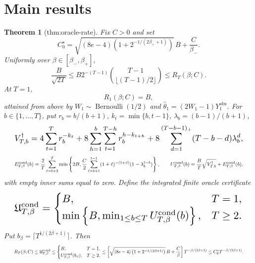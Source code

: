 \documentclass{article}
\newtheorem{theorem}{Theorem}
\begin{document}
\section{Main results}

\begin{theorem}[thm:oracle-rate]\label{thm:oracle-rate}
Fix \(C>0\) and set \[C_0^\star=\sqrt{(8e-4)\left(1+2^{-1/(2\beta_++1)}\right)}\,B+\frac C{\beta_-}.\] Uniformly over \(\beta\in[\beta_-,\beta_+]\), \[\frac{B}{\sqrt{2T}}\le B2^{-(T-1)}\binom{T-1}{\lfloor(T-1)/2\rfloor}\le R_T(\beta;C).\] At \(T=1\), \[R_1(\beta;C)=B,\] attained from above by \(W_1\sim\operatorname{Bernoulli}(1/2)\) and \(\widehat\theta_1=(2W_1-1)Y_1^{\mathrm{obs}}\). For \(b\in\{1,\ldots,T\}\), put \(r_b=b/(b+1)\), \(k_t=\min\{b,t-1\}\), \(\lambda_b=(b-1)/(b+1)\), \[
\makebox[\linewidth][c]{\resizebox{0.98\linewidth}{!}{\leavevmode\par\noindent \makebox[\linewidth][c]{\resizebox{0.98\linewidth}{!}{\(\displaystyle \displaystyle V_{T,b}^{\dagger}=4\sum_{t=1}^T r_b^{-k_t}+8\sum_{h=1}^b\sum_{t=1}^{T-h}r_b^{h-k_{t+h}}+8\sum_{d=1}^{(T-b-1)_+}(T-b-d)\lambda_b^d,\)}}\par\noindent}}
\] \[
\makebox[\linewidth][c]{\resizebox{0.98\linewidth}{!}{\leavevmode\par\noindent \makebox[\linewidth][c]{\resizebox{0.98\linewidth}{!}{\(\displaystyle \displaystyle E_{T,\beta}^{\mathrm{cond}}(b)=\frac2T\sum_{t=b+2}^T\min\left\{2B,\frac C2\sum_{\ell=b+1}^{t-1}(1+\ell)^{-(1+\beta)}(1-\lambda_b^{\ell-b})\right\},\qquad U_{T,\beta}^{\mathrm{cond}}(b)=\frac BT\sqrt{V_{T,b}^{\dagger}}+E_{T,\beta}^{\mathrm{cond}}(b),\)}}\par\noindent}}
\] with empty inner sums equal to zero. Define the integrated finite oracle certificate \[
\makebox[\linewidth][c]{\resizebox{0.98\linewidth}{!}{\leavevmode\par\noindent \makebox[\linewidth][c]{\resizebox{0.98\linewidth}{!}{\(\displaystyle \displaystyle \mathfrak U_{T,\beta}^{\mathrm{cond}}=\begin{cases}B,&T=1,\\ \min\left\{B,\min_{1\le b\le T}U_{T,\beta}^{\mathrm{cond}}(b)\right\},&T\ge2.\end{cases}\)}}\par\noindent}}
\] Put \(b_\beta=\lceil T^{1/(2\beta+1)}\rceil\). Then \[
\makebox[\linewidth][c]{\resizebox{0.98\linewidth}{!}{\leavevmode\par\noindent \makebox[\linewidth][c]{\resizebox{0.98\linewidth}{!}{\(\displaystyle \displaystyle R_T(\beta;C)\le\mathfrak U_{T,\beta}^{\mathrm{cond}}\le\begin{cases}B,&T=1,\\ U_{T,\beta}^{\mathrm{cond}}(b_\beta),&T\ge2,\end{cases}\le\left[\sqrt{(8e-4)\left(1+2^{-1/(2\beta+1)}\right)}\,B+\frac C\beta\right]T^{-\beta/(2\beta+1)}\le C_0^\star T^{-\beta/(2\beta+1)}.\)}}\par\noindent}}
\]
\end{theorem}
\end{document}
